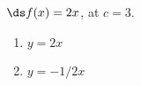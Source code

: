 {$\ds f(x) = 2x$, at $c=3$.
}
{\begin{enumerate}
\item		$y = 2x$
\item		$y = -1/2x$
\end{enumerate}
}

